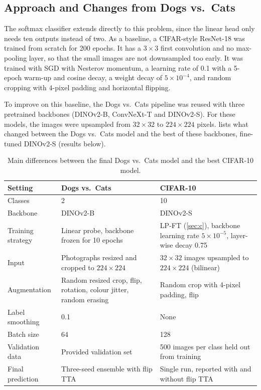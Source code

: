 \documentclass[11pt,a4paper]{article}
\begin{document}
\subsection*{Approach and Changes from Dogs vs.\ Cats}

The softmax classifier extends directly to this problem, since the linear head only needs ten outputs instead of two. As a baseline, a CIFAR-style ResNet-18 was trained from scratch for 200 epochs. It has a $3 \times 3$ first convolution and no max-pooling layer, so that the small images are not downsampled too early. It was trained with SGD with Nesterov momentum, a learning rate of 0.1 with a 5-epoch warm-up and cosine decay, a weight decay of $5 \times 10^{-4}$, and random cropping with 4-pixel padding and horizontal flipping.

To improve on this baseline, the Dogs vs.\ Cats pipeline was reused with three pretrained backbones (DINOv2-B, ConvNeXt-T and DINOv2-S). For these models, the images were upsampled from $32 \times 32$ to $224 \times 224$ pixels.  lists what changed between the Dogs vs.\ Cats model and the best of these backbones, fine-tuned DINOv2-S (results below).

\begin{table}[ht]
  \centering
  \small
  \caption{Main differences between the final Dogs vs.\ Cats model and the best CIFAR-10 model.}
  \label{tab:cifarchanges}
  \begin{tabularx}{\textwidth}{@{}l X X@{}}
    \toprule
    Setting & Dogs vs.\ Cats & CIFAR-10 \\
    \midrule
    Classes & 2 & 10 \\
    Backbone & DINOv2-B & DINOv2-S \\
    Training strategy & Linear probe, backbone frozen for 10 epochs & LP-FT (\cref{sec:c}), backbone learning rate $5 \times 10^{-5}$, layer-wise decay 0.75 \\
    Input & Photographs resized and cropped to $224 \times 224$ & $32 \times 32$ images upsampled to $224 \times 224$ (bilinear) \\
    Augmentation & Random resized crop, flip, rotation, colour jitter, random erasing & Random crop with 4-pixel padding, flip \\
    Label smoothing & 0.1 & None \\
    Batch size & 64 & 128 \\
    Validation data & Provided validation set & 500 images per class held out from training \\
    Final prediction & Three-seed ensemble with flip TTA & Single run, reported with and without flip TTA \\
    \bottomrule
  \end{tabularx}
\end{table}
\end{document}
